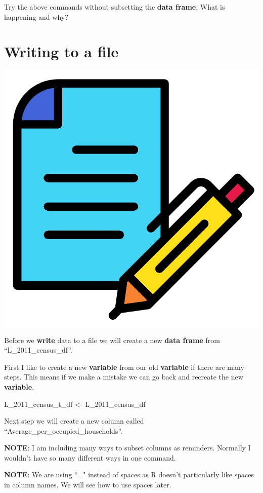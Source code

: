 \documentclass[]{book}
\newenvironment{Shaded}{\begin{snugshade}}{\end{snugshade}}
\newcommand{\DecValTok}[1]{\textcolor[rgb]{0.00,0.00,0.81}{#1}}
\newcommand{\StringTok}[1]{\textcolor[rgb]{0.31,0.60,0.02}{#1}}
\newcommand{\OperatorTok}[1]{\textcolor[rgb]{0.81,0.36,0.00}{\textbf{#1}}}
\newcommand{\NormalTok}[1]{#1}
\begin{document}
Try the above commands without subsetting the \textbf{data frame}. What
is happening and why?

\section{Writing to a file}\label{writing-to-a-file}

\begin{center}\includegraphics[width=0.2\linewidth]{figures/R_writing} \end{center}

Before we \textbf{write} data to a file we will create a new
\textbf{data frame} from ``L\_2011\_census\_df''.

First I like to create a new \textbf{variable} from our old
\textbf{variable} if there are many steps. This means if we make a
mistake we can go back and recreate the new \textbf{variable}.

\begin{Shaded}
\begin{Highlighting}[]
\NormalTok{L_2011_census_t_df <-}\StringTok{ }\NormalTok{L_2011_census_df}
\end{Highlighting}
\end{Shaded}

Next step we will create a new column called
``Average\_per\_occupied\_households''.

\textbf{NOTE}: I am including many ways to subset columns as reminders.
Normally I wouldn't have so many different ways in one command.

\textbf{NOTE}: We are using ``\_" instead of spaces as R doesn't
particularly like spaces in column names. We will see how to use spaces
later.

\begin{Shaded}
\end{Shaded}
\end{document}
